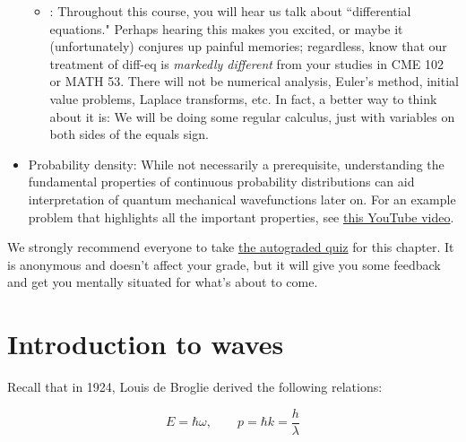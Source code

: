 \begin{itemize}
\begin{itemize}
		\item {}: Throughout this course, you will hear us talk about ``differential equations."
		Perhaps hearing this makes you excited, or maybe it {\small(unfortunately)} conjures up painful memories; regardless, know that our treatment of diff-eq is \emph{markedly different} from your studies in CME 102 or MATH 53. 
		There will not be numerical analysis, Euler's method, initial value problems, Laplace transforms, etc.
		In fact, a better way to think about it is: We will be doing some regular calculus, just with variables on both sides of the equals sign.
	\end{itemize}
	
	\item Probability density: While not necessarily a prerequisite, understanding the fundamental properties of continuous probability distributions can aid interpretation of quantum mechanical wavefunctions later on.
	For an example problem that highlights all the important properties, see \href{https://www.youtube.com/watch?v=QKA4HNEw3aY}{this YouTube video}.
\end{itemize}

\begin{tcolorbox}[colframe=PaloAlto, colbacktitle=PaloAlto!20!white, title=Pre-check quiz]
	We strongly recommend everyone to take \href{https://forms.gle/3HcR81RWdTTRJXzGA}{the autograded quiz} for this chapter.
	It is anonymous and doesn't affect your grade, but it will give you some feedback and get you mentally situated for what's about to come.
\end{tcolorbox}


\section{Introduction to waves}

Recall that in 1924, Louis de Broglie derived the following relations:

\begin{tcolorbox}[title=de Broglie relations] \vspace{-2ex}
	\begin{equation*}
		E=\hbar\omega, \qquad p = \hbar k = \frac{h}{\lambda}
	\end{equation*}
\end{tcolorbox}


